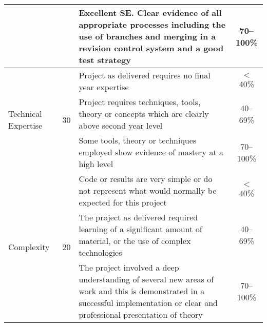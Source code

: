 \documentclass[11pt]{article}
\begin{document}
\begin{tabular}{||l|c|p{10cm}|c||}
\cline{3-4}
&& Excellent SE.  Clear evidence of all appropriate processes including the use of branches and merging in a revision control system and a good test strategy & 70--100\%  \\
\hline
\hline
\multirow{3}{*}{Technical Expertise} & \multirow{3}{*}{30} & Project as delivered requires no final year expertise& $<$ 40\% \\
\cline{3-4}
&& Project requires techniques, tools, theory or concepts which are clearly above second year level   & 40--69\%  \\
\cline{3-4}
&& Some tools, theory or techniques employed show evidence of mastery at a high level & 70--100\%  \\
\hline
\hline
\multirow{3}{*}{Complexity} & \multirow{3}{*}{20} & Code or results are very simple or do not represent what would normally be expected for this project & $<$ 40\% \\
\cline{3-4}
&& The project as delivered required learning of a significant amount of material, or the use of complex technologies  & 40--69\%  \\
\cline{3-4}
&& The project involved a deep understanding of several new areas of work and this is demonstrated in a successful implementation or clear and professional presentation of theory & 70--100\%  \\
\hline
\hline


\end{tabular}
\end{document}
